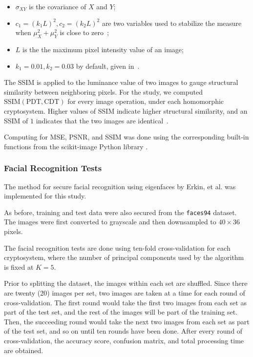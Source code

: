 \begin{description}
\begin{itemize}
		\item $\sigma_{XY}$ is the covariance of $X$ and $Y$;
		\item $c_1 = (k_1L)^2, c_2 = (k_2L)^2$ are two variables used to stabilize the measure when $\mu_X^2+\mu_Y^2$ is close to zero~\cite{akramullah_video_2014};
		\item $L$ is the the maximum pixel intensity value of an image;
		\item $k_1 = 0.01, k_2 = 0.03$ by default, given in~\cite{ahmed_benchmark_2016}.
	\end{itemize}
	The SSIM is applied to the luminance value of two images to gauge structural similarity between neighboring pixels.
	For the study, we computed $\mathrm{SSIM}(\mathrm{PDT}, \mathrm{CDT})$ for every image operation, under each homomorphic cryptosystem. Higher values of SSIM indicate higher structural similarity, and an SSIM of $1$ indicates that the two images are identical~\cite{ahmed_benchmark_2016}.
\end{description}

Computing for MSE, PSNR, and SSIM was done using the corresponding built-in functions from the scikit-image Python library \cite{scikit-image}.

\subsubsection{Facial Recognition Tests}
The method for secure facial recognition using eigenfaces by Erkin, et al. \cite{hutchison_privacy-preserving_2009} was implemented for this study.

As before, training and test data were also secured from the \texttt{faces94} dataset. The images were first converted to grayscale and then downsampled to $40 \times 36$ pixels.

The facial recognition tests are done using ten-fold cross-validation for each cryptosystem, where the number of principal components used by the algorithm is fixed at $K=5$.

Prior to splitting the dataset, the images within each set are shuffled. Since there are twenty (20) images per set, two images are taken at a time for each round of cross-validation. The first round would take the first two images from each set as part of the test set, and the rest of the images will be part of the training set. Then, the succeeding round would take the next two images from each set as part of the test set, and so on until ten rounds have been done. After every round of cross-validation, the accuracy score, confusion matrix, and total processing time are obtained.

